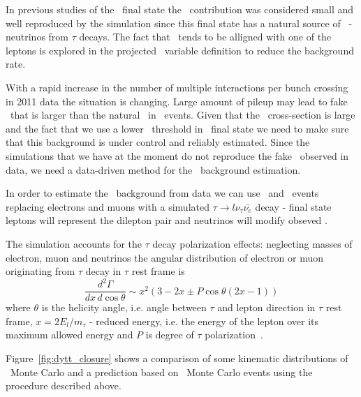 In previous studies of the \WW\ final state the \dytt\ contribution
was considered small and well reproduced by the simulation since this
final state has a natural source of \met\ - neutrinos from $\tau$
decays. The fact that \met\ tends to be alligned with one of the
leptons is explored in the projected \met\ variable definition to
reduce the background rate.

With a rapid increase in the number of multiple interactions per bunch
crossing in 2011 data the situation is changing. Large amount of
pileup may lead to fake \met\ that is larger than the natural \met\
in \dytt\ events. Given that the \dytt\ cross-section is large and the
fact that we use a lower \met\ threshold in \emu\ final state we need
to make sure that this background is under control and reliably
estimated. Since the simulations that we have at the moment do not
reproduce the fake \met\ observed in data, we need a data-driven
method for the \dytt\ background estimation.

In order to estimate the \dytt\ background from data we can use \zee\
and \zmm\ events replacing electrons and muons with a simulated
$\tau\to l\nu_\tau\bar{\nu_e}$ decay - final state leptons will
represent the dilepton pair and neutrinos will modify obseved \met{}.

The simulation accounts for the $\tau$ decay polarization effects:
neglecting masses of electron, muon and neutrinos the angular
distribution of electron or muon originating from $\tau$ decay in
$\tau$ rest frame is
\begin{equation}
        \frac{d^2\Gamma}{dx\,d\cos\theta}\sim x^2(3-2x \pm P\cos\theta(2x-1))
\end{equation}
where $\theta$ is the helicity angle, i.e. angle between $\tau$ and
lepton direction in $\tau$ rest frame, $x=2E_l/m_\tau$ - reduced
energy, i.e. the energy of the lepton over its maximum allowed energy
and $P$ is degree of $\tau$ polarization~\cite{pdg}.

Figure~\ref{fig:dytt_closure} shows a comparison of some kinematic
distributions of \dytt\ Monte Carlo and a prediction based on \dymm\
Monte Carlo events using the procedure described above.



